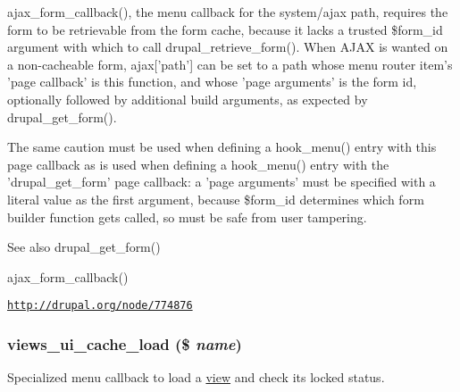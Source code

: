 ajax\_\-form\_\-callback(), the menu callback for the system/ajax path, requires the form to be retrievable from the form cache, because it lacks a trusted \$form\_\-id argument with which to call drupal\_\-retrieve\_\-form(). When AJAX is wanted on a non-\/cacheable form, ajax\mbox{[}'path'\mbox{]} can be set to a path whose menu router item's 'page callback' is this function, and whose 'page arguments' is the form id, optionally followed by additional build arguments, as expected by drupal\_\-get\_\-form().

The same caution must be used when defining a hook\_\-menu() entry with this page callback as is used when defining a hook\_\-menu() entry with the 'drupal\_\-get\_\-form' page callback: a 'page arguments' must be specified with a literal value as the first argument, because \$form\_\-id determines which form builder function gets called, so must be safe from user tampering.

\begin{DoxySeeAlso}{See also}
drupal\_\-get\_\-form() 

ajax\_\-form\_\-callback() 

\href{http://drupal.org/node/774876}{\tt http://drupal.org/node/774876} 
\end{DoxySeeAlso}
\hypertarget{views__ui_8module_a89d147761be3afc8b2728b071a2ac7f8}{
\subsubsection[{views\_\-ui\_\-cache\_\-load}]{\setlength{\rightskip}{0pt plus 5cm}views\_\-ui\_\-cache\_\-load (\$ {\em name})}}
\label{views__ui_8module_a89d147761be3afc8b2728b071a2ac7f8}
Specialized menu callback to load a \hyperlink{classview}{view} and check its locked status.


